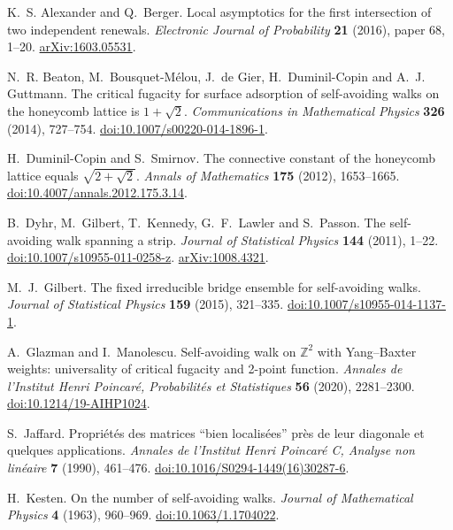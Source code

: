 K.~S. Alexander and Q.~Berger.
Local asymptotics for the first intersection of two independent renewals.
\emph{Electronic Journal of Probability} \textbf{21} (2016), paper 68, 1--20.
\href{https://arxiv.org/abs/1603.05531}{arXiv:1603.05531}.

N.~R. Beaton, M.~Bousquet-M\'elou, J.~de Gier, H.~Duminil-Copin and A.~J. Guttmann.
The critical fugacity for surface adsorption of self-avoiding walks on the
honeycomb lattice is $1+\sqrt2$.
\emph{Communications in Mathematical Physics} \textbf{326} (2014), 727--754.
\href{https://doi.org/10.1007/s00220-014-1896-1}{doi:10.1007/s00220-014-1896-1}.

H.~Duminil-Copin and S.~Smirnov.
The connective constant of the honeycomb lattice equals $\sqrt{2+\sqrt2}$.
\emph{Annals of Mathematics} \textbf{175} (2012), 1653--1665.
\href{https://doi.org/10.4007/annals.2012.175.3.14}{doi:10.4007/annals.2012.175.3.14}.

B.~Dyhr, M.~Gilbert, T.~Kennedy, G.~F.~Lawler and S.~Passon.
The self-avoiding walk spanning a strip.
\emph{Journal of Statistical Physics} \textbf{144} (2011), 1--22.
\href{https://doi.org/10.1007/s10955-011-0258-z}
{doi:10.1007/s10955-011-0258-z}.
\href{https://arxiv.org/abs/1008.4321}{arXiv:1008.4321}.

M.~J.~Gilbert.
The fixed irreducible bridge ensemble for self-avoiding walks.
\emph{Journal of Statistical Physics} \textbf{159} (2015), 321--335.
\href{https://doi.org/10.1007/s10955-014-1137-1}
{doi:10.1007/s10955-014-1137-1}.

A.~Glazman and I.~Manolescu.
Self-avoiding walk on $\mathbb Z^2$ with Yang--Baxter weights:
universality of critical fugacity and 2-point function.
\emph{Annales de l'Institut Henri Poincar\'e, Probabilit\'es et Statistiques}
\textbf{56} (2020), 2281--2300.
\href{https://doi.org/10.1214/19-AIHP1024}{doi:10.1214/19-AIHP1024}.

S.~Jaffard.
Propri\'et\'es des matrices ``bien localis\'ees'' pr\`es de leur diagonale
et quelques applications.
\emph{Annales de l'Institut Henri Poincar\'e C, Analyse non lin\'eaire}
\textbf{7} (1990), 461--476.
\href{https://doi.org/10.1016/S0294-1449(16)30287-6}{doi:10.1016/S0294-1449(16)30287-6}.

H.~Kesten.
On the number of self-avoiding walks.
\emph{Journal of Mathematical Physics} \textbf{4} (1963), 960--969.
\href{https://doi.org/10.1063/1.1704022}{doi:10.1063/1.1704022}.

